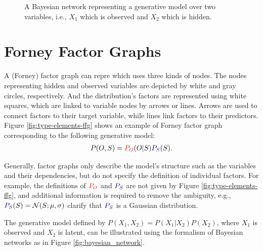 \documentclass[11pt,fleqn]{book} %
\begin{document}
\begin{figure}[H][square/.style={regular polygon,regular polygon sides=4}]
	\begin{center}
	\end{center}
\vspace{-0.25cm}
    \caption{A Bayesian network representing a generative model over two variables, i.e., $X_1$ which is observed and $X_2$ which is hidden.}
    \label{fig:factor_graph}
\end{figure}

\section{Forney Factor Graphs}

A (Forney) factor graph \cite{FFG} can repre which uses three kinds of nodes. The nodes representing hidden and observed variables are depicted by white and gray circles, respectively. And the distribution's factors are represented using white squares, which are linked to variable nodes by arrows or lines. Arrows are used to connect factors to their target variable, while lines link factors to their predictors. Figure \ref{fig:type-elements-ffg} shows an example of Forney factor graph corresponding to the following generative model:
\begin{align} \label{eq:general-generative-model}
P(O,S) = {\color{red!90!black}P_{O}}(O|S){\color{blue!50!black}P_{S}}(S).
\end{align}

Generally, factor graphs only describe the model's structure such as the variables and their dependencies, but do not specify the definition of individual factors. For example, the definitions of ${\color{red!90!black}P_{O}}$ and ${\color{blue!50!black}P_{S}}$ are not given by Figure \ref{fig:type-elements-ffg}, and additional information is required to remove the ambiguity, e.g., ${\color{blue!50!black}P_{S}}(S) = \mathcal{N}(S;\mu, \sigma)$ clarify that ${\color{blue!50!black}P_{S}}$ is a Gaussian distribution.

\begin{example}
The generative model defined by $P(X_1,X_2) = P(X_1|X_2)P(X_2)$, where $X_1$ is observed and $X_2$ is latent, can be illustrated using the formalism of Bayesian networks as in Figure \ref{fig:bayesian_network}.
\end{example}
\end{document}
